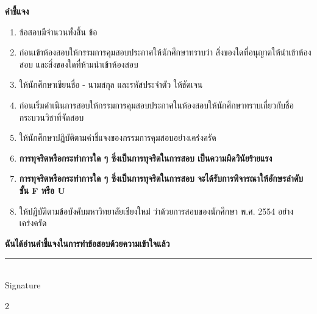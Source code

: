 \documentclass[a4paper, twoside]{article}
\begin{document}
{    \noindent \textbf{คำชี้แจง}
    \begin{enumerate}
        \item ข้อสอบมีจำนวนทั้งสิ้น  ข้อ
        \item ก่อนเข้าห้องสอบให้กรรมการคุมสอบประกาศให้นักศึกษาทราบว่า สิ่งของใดที่อนุญาตให้นำเข้าห้องสอบ และสิ่งของใดที่ห้ามนำเข้าห้องสอบ
        \item ให้นักศึกษาเขียนชื่อ - นามสกุล และรหัสประจำตัว ให้ชัดเจน
        \item ก่อนเริ่มดำเนินการสอบให้กรรมการคุมสอบประกาศในห้องสอบให้นักศึกษาทราบเกี่ยวกับชื่อกระบวนวิชาที่จัดสอบ
        \item ให้นักศึกษาปฏิบัติตามคำชี้แจงของกรรมการคุมสอบอย่างเคร่งครัด
        \item \textbf{การทุจริตหรือกระทำการใด ๆ ซึ่งเป็นการทุจริตในการสอบ เป็นความผิดวินัยร้ายแรง}
        \item \textbf{การทุจริตหรือกระทำการใด ๆ ซึ่งเป็นการทุจริตในการสอบ จะได้รับการพิจารณาให้อักษรลำดับขั้น F หรือ U}
        \item ให้ปฏิบัติตามข้อบังคับมหาวิทยาลัยเชียงใหม่ ว่าด้วยการสอบของนักศึกษา พ.ศ. 2554 อย่างเคร่งครัด
    \end{enumerate}

    \vspace{1cm}
    \begin{center}
        \textbf{ฉันได้อ่านคำชี้แจงในการทำข้อสอบด้วยความเข้าใจแล้ว}
    \end{center}
    \vspace{1cm}
    \hfill
    \begin{minipage}[t]{0.4\linewidth}
        \centering
        \rule{\linewidth}{0.4pt} \\
        \vspace{0.2cm}
        Signature
    \end{minipage}
    
    \AMCcleardoublepage


    \setlength{\columnsep}{.8cm}
    \begin{multicols}{2}
    \end{multicols}

}
\end{document}

